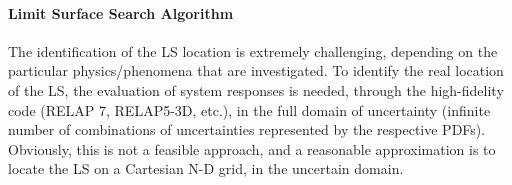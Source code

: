 \paragraph{Limit Surface Search Algorithm}
\label{par:LSSalgorithm}
The identification of the LS location is extremely challenging, 
depending on the particular physics/phenomena that are investigated. 
To identify the real location of the LS, the evaluation of system 
responses is needed, through the high-fidelity code (RELAP 7, 
RELAP5-3D, etc.), in the full domain of uncertainty (infinite number of 
combinations of uncertainties represented by the respective PDFs). 
Obviously, this is not a feasible approach, and a reasonable 
approximation is to locate the LS on a Cartesian N-D grid, in the 
uncertain domain.

